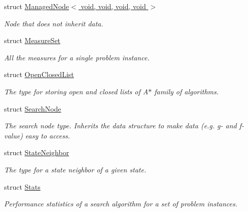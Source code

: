 \begin{DoxyCompactItemize}
struct \hyperlink{structslb_1_1core_1_1sb_1_1ManagedNode_3_01void_00_01void_00_01void_00_01void_01_4}{Managed\+Node$<$ void, void, void, void $>$}
\begin{DoxyCompactList}\small\item\em Node that does not inherit data. \end{DoxyCompactList}\item 
struct \hyperlink{structslb_1_1core_1_1sb_1_1MeasureSet}{Measure\+Set}
\begin{DoxyCompactList}\small\item\em All the measures for a single problem instance. \end{DoxyCompactList}\item 
struct \hyperlink{structslb_1_1core_1_1sb_1_1OpenClosedList}{Open\+Closed\+List}
\begin{DoxyCompactList}\small\item\em The type for storing open and closed lists of {\ttfamily A$\ast$} family of algorithms. \end{DoxyCompactList}\item 
struct \hyperlink{structslb_1_1core_1_1sb_1_1SearchNode}{Search\+Node}
\begin{DoxyCompactList}\small\item\em The search node type. Inherits the data structure to make data (e.\+g. g-\/ and f-\/value) easy to access. \end{DoxyCompactList}\item 
struct \hyperlink{structslb_1_1core_1_1sb_1_1StateNeighbor}{State\+Neighbor}
\begin{DoxyCompactList}\small\item\em The type for a state neighbor of a given state. \end{DoxyCompactList}\item 
struct \hyperlink{structslb_1_1core_1_1sb_1_1Stats}{Stats}
\begin{DoxyCompactList}\small\item\em Performance statistics of a search algorithm for a set of problem instances. \end{DoxyCompactList}\end{DoxyCompactItemize}
